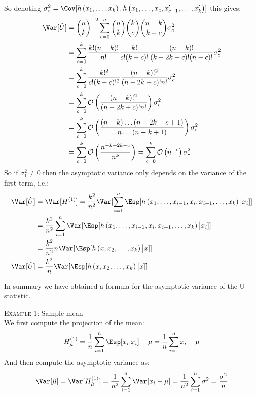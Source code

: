 \documentclass[12pt]{article}
\begin{document}
So denoting \(\sigma^2_c=\Cov[ h \left(x_{1},\ldots,x_{k} \right), h \left(x_{1},\ldots,x_{c},x'_{c+1},\ldots,x'_{k} \right)]\) this gives:
\begin{align*}
 \Var[\hat{U}] &= {n \choose k}^{-2} \sum_{c=0}^{n} {n \choose k} {k \choose c} {n - k \choose k - c} \sigma^2_c \\
&=  \sum_{c=0}^{k} \frac{k!(n-k)!}{n!}  \frac{k!}{c!(k-c)!} \frac{(n-k)!}{(k-2k+c)!(n-c)!} \sigma^2_c \\
&=  \sum_{c=0}^{k}  \frac{k!^2}{c!(k-c)!^2}  \frac{(n-k)!^2}{(n-2k+c)!n!} \sigma^2_c \\
&= \sum_{c=0}^{k} \mathcal{O}\left(\frac{(n-k)!^2}{(n-2k+c)!n!}\right) \sigma^2_c \\
&= \sum_{c=0}^{k} \mathcal{O}\left(\frac{(n-k) \ldots (n-2k+c+1)}{n \ldots (n-k+1) }\right) \sigma^2_c \\
&= \sum_{c=0}^{k} \mathcal{O}\left(\frac{n^{- k + 2k - c}}{n^{k}}\right) = \sum_{c=0}^{k} \mathcal{O}\left(n^{-c}\right) \sigma^2_c \\
\end{align*}
So if \(\sigma^2_1 \neq 0\) then the asymptotic variance only depends on the variance of the first term, i.e.:
\begin{align*}
\Var[\hat{U}] &= \Var[H^{(1)}] = \frac{k^2}{n^2}  \Var[ \sum_{i=1}^n \Esp[h \left(x_1,\ldots,x_{i-1},x_i,x_{i+1},\ldots,x_{k} \right) \big| x_i] ] \\
&= \frac{k^2}{n^2} \sum_{i=1}^n \Var[\Esp[h \left(x_1,\ldots,x_{i-1},x_i,x_{i+1},\ldots,x_{k} \right) \big| x_i] ] \\
&= \frac{k^2}{n^2} n \Var[\Esp[h \left(x,x_2,\ldots,x_{k} \right) \big| x] ] \\
\Var[\hat{U}] &= \frac{k^2}{n}  \Var[ \Esp[h \left(x,x_2,\ldots,x_{k} \right) \big| x] ]
\end{align*}

\bigskip

In summary we have obtained a formula for the asymptotic variance of
the U-statistic.

\bigskip

\textsc{Example 1}: Sample mean \\
We first compute the \Hajek projection of the mean:
\begin{align*}
H^{(1)}_{\hat{\mu}} = \frac{1}{n} \sum_{i=1}^n \Esp[x_i|x_i]-\mu = \frac{1}{n}  \sum_{i=1}^n x_i-\mu
\end{align*}
And then compute the asymptotic variance as:
\begin{align*}
\Var[\hat{\mu}] =  \Var[H^{(1)}_{\hat{\mu}}] = \frac{1}{n^2}  \sum_{i=1}^n \Var[x_i-\mu] = \frac{1}{n^2}  \sum_{i=1}^n \sigma^2 = \frac{\sigma^2}{n}
\end{align*}
\end{document}

